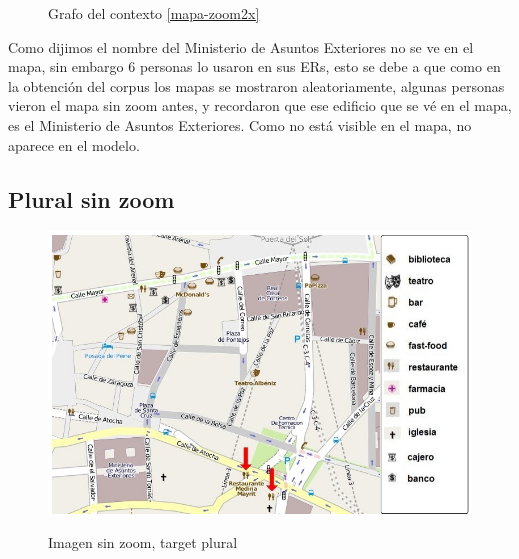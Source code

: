 \begin{figure}[ht]
\caption{Grafo del contexto \ref{mapa-zoom2x}}
\label{modelo-mapa-zoom2x}
\end{figure}

Como dijimos el nombre del Ministerio de Asuntos Exteriores no se ve en el mapa, sin embargo 6 personas lo usaron en sus ERs, 
esto se debe a que como en la obtenci\'on del corpus los mapas se mostraron aleatoriamente, algunas personas vieron el mapa sin zoom antes, 
y recordaron que ese edificio que se v\'e en el mapa, es el Ministerio de Asuntos Exteriores. Como no est\'a visible en el mapa, no aparece en el modelo.


\subsection{Plural sin zoom}
\label{sec:plural}
\begin{figure}
\centering
\includegraphics[width=\textwidth]{images/corpus/mapa10.png}\\[0pt]
\caption{Imagen sin zoom, target plural}
\label{mapa-zoom-plural}
\end{figure}



